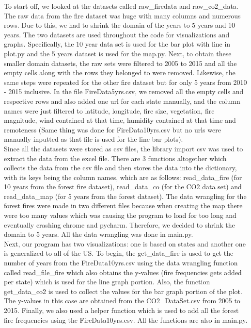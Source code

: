 \documentclass[fontsize=11pt]{article}
\begin{document}
To start off, we looked at the datasets called raw\_firedata and raw\_co2\_data. The raw data from the fire dataset was huge with many columns and numerous rows. Due to this, we had to shrink the domain of the years to 5 years and 10 years. The two datasets are used throughout the code for visualizations and graphs. Specifically, the 10 year data set is used for the bar plot with line in plot.py and the 5 years dataset is used for the map.py. Next, to obtain these smaller domain datasets, the raw sets were filtered to 2005 to 2015 and all the empty cells along with the rows they belonged to were removed. Likewise, the same steps were repeated for the other fire dataset but for only 5 years from 2010 - 2015 inclusive. In the file \‘FireData5yrs.csv\’, we removed all the empty cells and respective rows and also added one url for each state manually, and the column names were just filtered to latitude, longitude, fire size, vegetation, fire magnitude, wind contained at that time, humidity contained at that time and remoteness (Same thing was done for \‘FireData10yrs.csv\’ but no urls were manually inputted as that file is used for the line bar plots). \\
\newline
Since all the datasets were stored as csv files, the library \‘import csv\’ was used to extract the data from the excel file. There are 3 functions altogether which collects the data from the csv file and then stores the data into the dictionary, with its keys being the column names, which are as follows: read\_data\_fire (for 10 years from the forest fire dataset), read\_data\_co (for the CO2 data set) and read\_data\_map (for 5 years from the forest dataset). The data wrangling for the forest fires were made in two different files because when creating the map there were too many values which was causing the program to load for too long and eventually crashing chrome and pycharm. Therefore, we decided to shrink the domain to 5 years. All the data wrangling was done in main.py. \\
\newline
Next, our program has two visualizations: one is based on states and another one is generalized to all of the US. To begin, the get\_data\_fire is used to get the number of years from the \‘FireData10yrs.csv\’ using the data wrangling function called read\_file\_fire which also obtains the y-values (fire frequencies gets added per state) which is used for the line graph portion. Also, the function get\_data\_co2 is used to collect the values for the bar graph portion of the plot. The y-values in this case are obtained from the \‘CO2\_DataSet.csv\’ from 2005 to 2015. Finally, we also used a helper function which is used to add all the forest fire frequencies using the \‘FireData10yrs.csv\’. All the functions are also in main.py.\\
\end{document}
